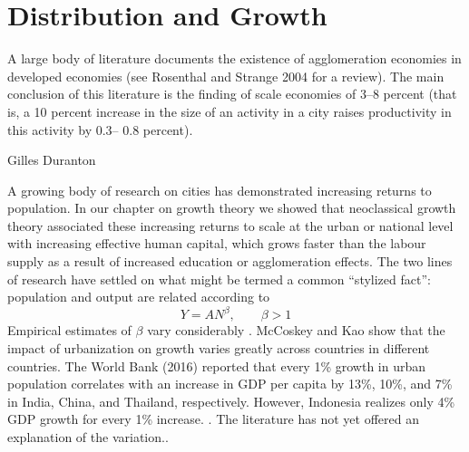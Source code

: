\chapter{Distribution and Growth} \label{chapter-distribution}

\epigraph{A large body of literature documents the existence of agglomeration economies in developed economies (see Rosenthal and Strange 2004 for a review). The main conclusion of this literature is the finding of scale economies of 3–8 percent (that is, a 10 percent increase in the size of an activity in a city raises productivity in this activity by 0.3– 0.8 percent).}{Gilles Duranton \cite{durantonAreCitiesEngines2009}} 



A growing body of research on cities has demonstrated increasing returns to population. In our chapter on growth theory we showed that neoclassical growth theory associated these increasing returns to scale at the urban or national level with increasing effective human capital, which grows faster than the labour supply as a result of increased education or agglomeration effects. The two lines of research have settled on what might be termed a  common ``stylized  fact'': population and output are related according to 
\begin{equation}
    Y=AN^\beta,\qquad \beta>1 \label{equation-the-fact}
\end{equation}
Empirical estimates of $\beta$ vary considerably\cite{rosenthalEvidenceNatureSources2004}\cite{bettencourtIntroductionUrbanScience2021} \cite{loboUrbanScalingProduction2013}. 
McCoskey and Kao \cite{mccoskeyPanelDataInvestigation}show that  the impact of urbanization on growth varies greatly across countries in different countries.
The World Bank (2016) reported that every 1\% growth in urban population correlates with an increase in GDP per capita by 13\%, 10\%, and 7\% in India, China, and Thailand, respectively.  However, Indonesia realizes only 4\% GDP growth for every 1\% increase. \cite{haryantotriRelationshipUrbanizationEducation2021}. The literature has not yet offered an explanation  of the variation.\cite{loboUrbanScalingProduction2013}.

